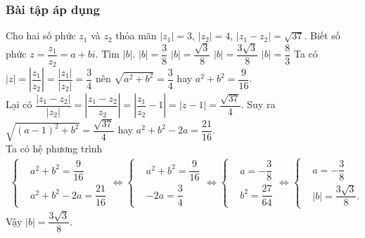 \subsubsection{Bài tập áp dụng}
\begin{bt}%
	Cho hai số phức $z_1$ và $z_2$ thỏa mãn $|z_1|=3$, $|z_2|=4$, $|z_1-z_2|=\sqrt{37}$. Biết số phức $z=\dfrac{z_1}{z_2}=a+bi$. Tìm $|b|$.
	\choice
	{$|b|= \dfrac{3}{8}$}
	{$|b|= \dfrac{\sqrt{3}}{8}$}
	{\True $|b|= \dfrac{3\sqrt{3}}{8}$}
	{$|b|= \dfrac{8}{3}$}
	\loigiai
	{
		Ta có $|z| = \left|\dfrac{z_1}{z_2}\right| = \dfrac{|z_1|}{|z_2|} = \dfrac{3}{4}$ nên $\sqrt{a^2+b^2} = \dfrac{3}{4}$ hay $a^2+b^2 = \dfrac{9}{16}$.\\
		Lại có $\dfrac{|z_1-z_2|}{|z_2|} = \left|\dfrac{z_1-z_2}{z_2}\right| = \left|\dfrac{z_1}{z_2}-1 \right| = |z-1|=\dfrac{\sqrt{37}}{4}$. Suy ra $\sqrt{(a-1)^2+b^2} = \dfrac{\sqrt{37}}{4}$ hay $a^2+b^2-2a = \dfrac{21}{16}$.\\
		Ta có hệ phương trình
		\begin{eqnarray*}
			\left\{\begin{aligned}&a^2+b^2 = \dfrac{9}{16} \\&a^2+b^2-2a=\dfrac{21}{16}\end{aligned}\right. \Leftrightarrow \left\{\begin{aligned}&a^2+b^2=\dfrac{9}{16} \\&-2a=\dfrac{3}{4}\end{aligned}\right. \Leftrightarrow \left\{\begin{aligned}&a=-\dfrac{3}{8} \\&b^2=\dfrac{27}{64}\end{aligned}\right. \Leftrightarrow \left\{\begin{aligned}&a=-\dfrac{3}{8} \\&|b|=\dfrac{3\sqrt{3}}{8}.\end{aligned}\right.
		\end{eqnarray*}
		Vậy $|b|=\dfrac{3\sqrt{3}}{8}$.
	}
\end{bt}

